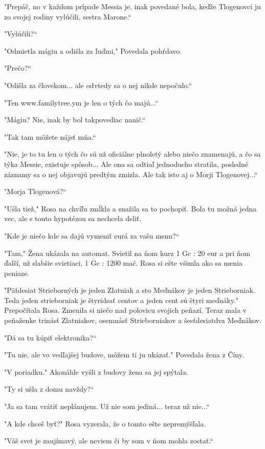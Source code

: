 \documentclass{book}
\begin{document}
"$ $Prepáč, no v každom prípade Messia je, inak povedané bola, keďže Tlogenovci ju zo svojej rodiny vylúčili, sestra Marone.“

"$ $Vylúčili?“

"$ $Odmietla mágiu a odišla za ľuďmi,"$ $ Povedala pohŕdavo.

"$ $Prečo?“

"$ $Odišla za človekom... ale odvtedy sa o nej nikde nepočulo.“

"$ $Ten www.familytree.ym je len o tých čo majú...“

"$ $Mágiu? Nie, inak by bol takpovediac nanič.“

"$ $Tak tam môžete nájsť mňa.“

"$ $Nie, je to tu len o tých čo sú už oficiálne plnoletý alebo niečo znamenajú, a čo sa týka Messie, existuje spôsob... Ale ona sa odtiaľ jednoducho stratila, posledné záznamy sa o nej objavujú predtým zmizla. Ale tak isto aj o Morji Tlogenovej...“

"$ $Morja Tlogenová?“

"$ $Ušla tiež,"$ $ Rosa na chvíľu zmĺkla a snažila sa to pochopiť. Bola tu možná jedna vec, ale s touto hypotézou sa nechcela deliť.

"$ $Kde je niečo kde sa dajú vymeniť eurá za vašu menu?“

"$ $Tam,"$ $ Žena ukázala na automat. Svietil na ňom kurz 1 Gc : 20 eur a pri ňom ďalší, už slabšie svietiaci, 1 Gc : 1200 mač. Rosa si ešte všimla ako sa menia peniaze.

"$ $Päťdesiat Strieborných je jeden Zlatniak a sto Meďnákov je jeden Strieborniak. Teda jeden strieborniak je štyridsať centov a jeden cent sú štyri meďnáky."$ $ Prepočítala Rosa. Zmenila si niečo nad polovicu svojich peňazí. Teraz mala v peňaženke trinásť Zlatniakov, osemnásť Strieborniakov a šesťdesiatdva Meďnákov.

"$ $Dá sa tu kúpiť elektronika?“

"$ $Tu nie, ale vo vedľajšej budove, môžem ti ju ukázať."$ $ Povedala žena z Číny.

"$ $V poriadku."$ $ Akonáhle vyšli z budovy žena sa jej spýtala.

"$ $Ty si ušla z domu navždy?“

"$ $Ja sa tam vrátiť neplánujem. Už nie som jediná... teraz už nie...“

"$ $A kde chceš byť?"$ $ Rosa vyzerala, že o tomto ešte nepremýšľala.

"$ $Váš svet je zaujímavý, ale neviem či by som v ňom mohla zostať.“
\end{document}
